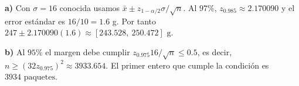\textbf{a)} Con $\sigma=16$ conocida usamos
$\bar x\pm z_{1-\alpha/2}\sigma/\sqrt n$. Al $97\%$,
$z_{0.985}\approx2.170090$ y el error estándar es $16/10=1.6$ g.
Por tanto $247\pm2.170090(1.6)\approx\boxed{[243.528,\ 250.472]\text{ g}}$.

\textbf{b)} Al $95\%$ el margen debe cumplir
$z_{0.975}16/\sqrt n\le0.5$, es decir,
$n\ge(32z_{0.975})^2\approx3933.654$. El primer entero
que cumple la condición es $\boxed{3934\text{ paquetes}}$.
